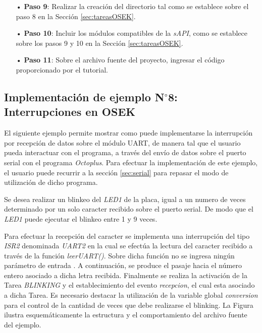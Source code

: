 \documentclass[12pt,letterpaper]{article}
\begin{document}
\begin{enumerate}
\item[•]\textbf{Paso 9}: Realizar la creación del directorio tal como se establece sobre el paso 8 en la Sección \ref{sec:tareasOSEK}.
\item[•]\textbf{Paso 10}: Incluir los módulos compatibles de la \textit{sAPI}, como se establece sobre los pasos 9 y 10 en la Sección \ref{sec:tareasOSEK}.
\item[•]\textbf{Paso 11}: Sobre el archivo fuente del proyecto, ingresar el código proporcionado por el tutorial.
\end{enumerate}
\subsection{Implementación de ejemplo N$^{\circ}$8: Interrupciones en OSEK}
El siguiente ejemplo permite mostrar como puede implementarse la interrupción por recepción de datos sobre el módulo UART, de manera tal que el usuario pueda interactuar con el programa, a través del envío de datos sobre el puerto serial con el programa \textit{Octoplus}. Para efectuar la implementación de este ejemplo, el usuario puede recurrir a la sección \ref{sec:serial} para repasar el modo de utilización de dicho programa.

Se desea realizar un blinkeo del \textit{LED1} de la placa, igual a un numero de veces determinado por un solo caracter recibido sobre el puerto serial. De modo que el \textit{LED1} puede ejecutar el blinkeo entre 1 y 9 veces.

Para efectuar la recepción del caracter se implementa una interrupción del tipo \textit{ISR2} denominada \textit{UART2} en la cual se efectúa la lectura del caracter recibido a través de la función \textit{leerUART()}. Sobre dicha función no se ingresa ningún parámetro de entrada . A continuación, se produce el pasaje hacia el número entero asociado a dicha letra recibida. Finalmente se realiza la activación de la Tarea \textit{BLINKING} y el establecimiento del evento \textit{recepcion}, el cual esta asociado a dicha Tarea. Es necesario destacar la utilización de la variable global \textit{conversion} para el control de la cantidad de veces que debe realizarse el blinking. La Figura  ilustra esquemáticamente la estructura y el comportamiento del archivo fuente del ejemplo.
\end{document}
